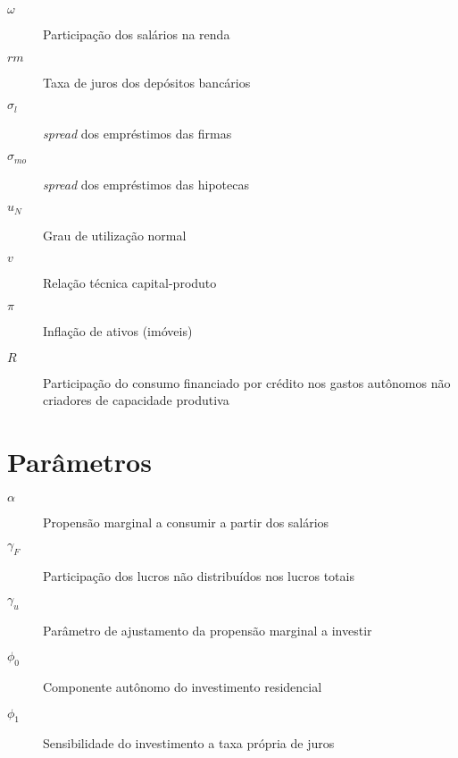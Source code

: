 \begin{description}
	\item[$\omega$] Participação dos salários na renda
	\item[$rm$] Taxa de juros dos depósitos bancários
	\item[$\sigma_l$] \textit{spread} dos empréstimos das firmas
	\item[$\sigma_{mo}$] \textit{spread} dos empréstimos das hipotecas
	\item[$u_N$] Grau de utilização normal
	\item[$v$] Relação técnica capital-produto
	\item[$\pi$] Inflação de ativos (imóveis)
	\item[$R$] Participação do consumo financiado por crédito nos gastos autônomos não criadores de capacidade produtiva
\end{description}



\section*{Parâmetros}

\begin{description}
	\item[$\alpha$] Propensão marginal a consumir a partir dos salários
	\item[$\gamma_F$] Participação dos lucros não distribuídos nos lucros totais
	\item[$\gamma_u$] Parâmetro de ajustamento da propensão marginal a investir
	\item[$\phi_0$] Componente autônomo do investimento residencial
	\item[$\phi_1$] Sensibilidade do investimento a taxa própria de juros
\end{description}
